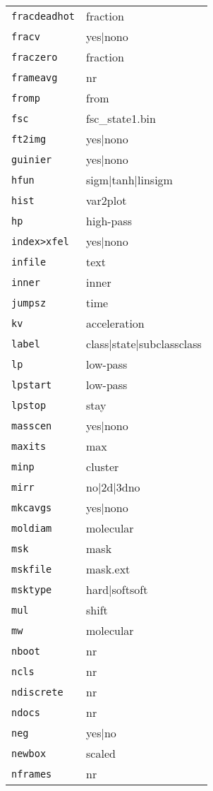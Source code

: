 \begin{tabular}{ll}
\texttt{fracdeadhot}&{fraction}\\
\texttt{fracv}&{yes|no{no}}\\
\texttt{fraczero}&{fraction}\\
\texttt{frameavg}&{nr}\\
\texttt{fromp}&{from}\\
\texttt{fsc}&{fsc\_state1.bin}\\
\texttt{ft2img}&{yes|no{no}}\\
\texttt{guinier}&{yes|no{no}}\\
\texttt{hfun}&{sigm|tanh|lin{sigm}}\\
\texttt{hist}&{var2plot}\\
\texttt{hp}&{high-pass}\\
\texttt{index>xfel}&{yes|no{no}}\\
\texttt{infile}&{text}\\
\texttt{inner}&{inner}\\
\texttt{jumpsz}&{time}\\
\texttt{kv}&{acceleration}\\
\texttt{label}&{class|state|subclass{class}}\\
\texttt{lp}&{low-pass}\\
\texttt{lpstart}&{low-pass}\\
\texttt{lpstop}&{stay}\\
\texttt{masscen}&{yes|no{no}}\\
\texttt{maxits}&{max}\\
\texttt{minp}&{cluster}\\
\texttt{mirr}&{no|2d|3d{no}}\\
\texttt{mkcavgs}&{yes|no{no}}\\
\texttt{moldiam}&{molecular}\\
\texttt{msk}&{mask}\\
\texttt{mskfile}&{mask.ext}\\
\texttt{msktype}&{hard|soft{soft}}\\
\texttt{mul}&{shift}\\
\texttt{mw}&{molecular}\\
\texttt{nboot}&{nr}\\
\texttt{ncls}&{nr}\\
\texttt{ndiscrete}&{nr}\\
\texttt{ndocs}&{nr}\\
\texttt{neg}&{yes|no}\\
\texttt{newbox}&{scaled}\\
\texttt{nframes}&{nr}\\

\end{tabular}
